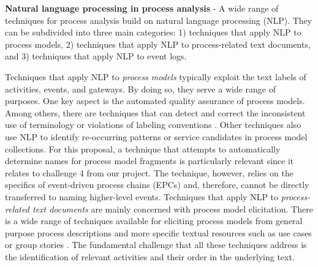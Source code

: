 \textbf{Natural language processing in process analysis} - A wide range of techniques for process analysis build on natural language processing (NLP). They can be subdivided into three main categories: 1) techniques that apply NLP to process models, 2) techniques that apply NLP to process-related text documents, and 3) techniques that apply NLP to event logs.  

Techniques that apply NLP to \textit{process models} typically exploit the text labels of activities, events, and gateways. By doing so, they serve a wide range of purposes. One key aspect is the automated quality assurance of process models. Among others, there are techniques that can detect and correct the inconsistent use of terminology \cite{koschmider2007user,pittke2015automatic} or violations of labeling conventions \cite{becker2009towards,leopold2013detection}. Other techniques also use NLP to identify re-occurring patterns \cite{la2015detecting} or service candidates \cite{leopold2015_jss} in process model collections. For this proposal, a technique that attempts to automatically determine names for process model fragments is particularly relevant \cite{leopold2014simplifying} since it relates to challenge 4 from our project. The technique, however, relies on the specifics of event-driven process chains (EPCs) and, therefore, cannot be directly transferred to naming higher-level events. 
%
Techniques that apply NLP to \textit{process-related text documents} are mainly concerned with process model elicitation. There is a wide range of techniques available for eliciting process models from general purpose process descriptions \cite{ghose2007process,friedrich2011process,epure2015automatic} and more specific textual resources such as use cases \cite{sinha2010use} or group stories  \cite{de2009business}. The fundamental challenge that all these techniques address is the identification of relevant activities and their order in the underlying text. 
%
